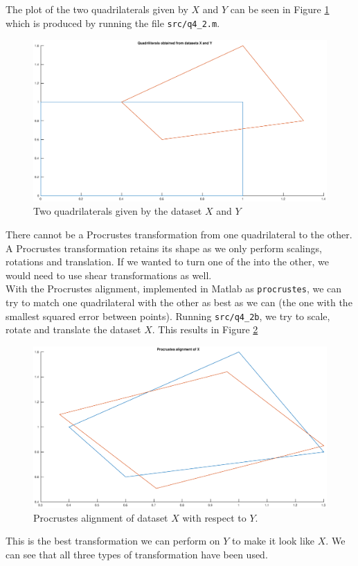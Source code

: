 \documentclass[a4paper]{article}
\begin{document}
\subsection{}
The plot of the two quadrilaterals given by $X$ and $Y$ can be seen in Figure \ref{fig3} which is produced by running the file \texttt{src/q4\_2.m}.
\begin{figure}[H]
  \centering
  \captionsetup{justification=centering}
  \includegraphics[width=\textwidth]{fig3.eps}
  \caption{Two quadrilaterals given by the dataset $X$ and $Y$}
  \label{fig3}
\end{figure}
There cannot be a Procrustes transformation from one quadrilateral to the other. A Procrustes transformation retains its shape as we only perform scalings, rotations and translation. If we wanted to turn one of the into the other, we would need to use shear transformations as well. \\
With the Procrustes alignment, implemented in Matlab as \texttt{procrustes}, we can try to match one quadrilateral with the other as best as we can (the one with the smallest squared error between points). Running \texttt{src/q4\_2b}, we try to scale, rotate and translate the dataset $X$. This results in Figure \ref{fig4}
\begin{figure}[H]
  \centering
  \captionsetup{justification=centering}
  \includegraphics[width=\textwidth]{fig4.eps}
  \caption{Procrustes alignment of dataset $X$ with respect to $Y$.}
  \label{fig4}
\end{figure}
This is the best transformation we can perform on $Y$ to make it look like $X$. We can see that all three types of transformation have been used.
\end{document}
